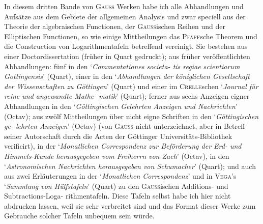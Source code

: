 \documentclass[12pt,a4paper]{article}
\begin{document}
In diesem dritten Bande von \textsc{Gau\ss} Werken habe ich alle Abhandlungen und Aufs\"atze aus dem
Gebiete der allgemeinen Analysis und zwar speciell aus der Theorie der algebraischen Functionen, der
\textsc{Gau\ss}ischen Reihen und der Elliptischen Functionen, so wie einige Mittheilungen das \textsc{Pfaff}sche Theorem
und die Construction von Logarithmentafeln betreffend vereinigt. Sie bestehen aus einer Doctordissertation
(fr\"uher in Quart gedruckt); aus fr\"uher ver\"offentlichten Abhandlungen: f\"unf in den `\textit{Commentationes societa-\linebreak
\hspace*{\fill} tis regiae scientiarum Gottingensis}' (Quart), einer in den `\textit{Abhandlungen der k\"oniglichen Gesellschaft der\linebreak
\hspace*{\fill} Wissenschaften zu G\"ottingen}' (Quart) und einer im \textsc{Crelle}schen `\textit{Journal f\"ur reine und angewandte Mathe-\linebreak
\hspace*{\fill} matik}' (Quart); ferner aus sechs Anzeigen eigner Abhandlungen in den `\textit{G\"ottingischen Gelehrten Anzeigen\linebreak
\hspace*{\fill} und Nachrichten}' (Octav); aus zw\"olf Mittheilungen \"uber nicht eigne Schriften in den `\textit{G\"ottingischen ge-\linebreak
\hspace*{\fill} lehrten Anzeigen}' (Octav) (von \textsc{Gau\ss} nicht unterzeichnet, aber in Betreff seiner Autorschaft durch die Acten\linebreak
\hspace*{\fill} der G\"ottinger Universit\"ats-Bibliothek verificirt), in der `\textit{Monatlichen Correspondenz zur Bef\"orderung der Erd-\linebreak
\hspace*{\fill} und Himmels-Kunde herausgegeben vom Freiherrn von Zach}' (Octav), in den `\textit{Astronomischen Nachrichten\linebreak
\hspace*{\fill} herausgegeben von Schumacher}' (Quart); und auch aus zwei Erl\"auterungen in der `\textit{Monatlichen Correspondenz}'\linebreak
und in \textsc{Vega}'s `\textit{Sammlung von H\"ulfstafeln}' (Quart) zu den \textsc{Gau\ss}ischen Additions- und Subtractions-Loga-\linebreak
rithmentafeln. Diese Tafeln selbst habe ich hier nicht abdrucken lassen, weil sie sehr verbreitet sind und\linebreak
das Format dieser Werke zum Gebrauche solcher Tafeln unbequem sein w\"urde.
\end{document}
